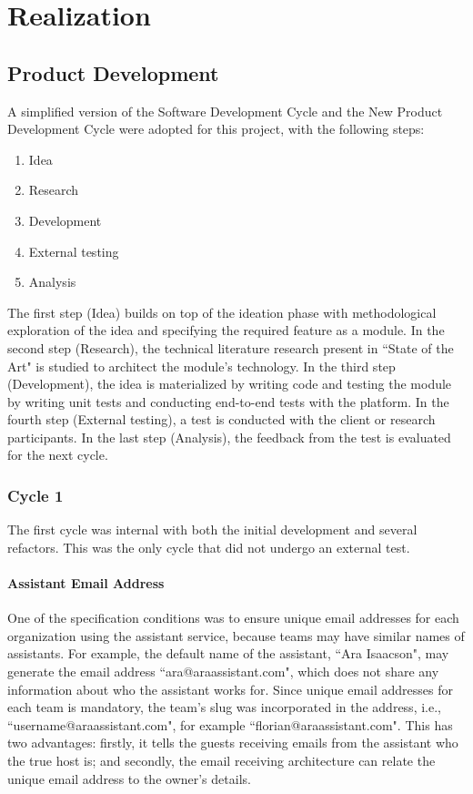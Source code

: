 \documentclass{article}
\begin{document}
\newpage

\section{Realization}

\subsection{Product Development}

A simplified version of the Software Development Cycle and the New Product Development Cycle were adopted for this project, with the following steps:

\begin{enumerate}
	\item Idea
	\item Research
	\item Development
	\item External testing
	\item Analysis
\end{enumerate}

The first step (Idea) builds on top of the ideation phase with methodological exploration of the idea and specifying the required feature as a module. In the second step (Research), the technical literature research present in ``State of the Art" is studied to architect the module's technology. In the third step (Development), the idea is materialized by writing code and testing the module by writing unit tests and conducting end-to-end tests with the platform. In the fourth step (External testing), a test is conducted with the client or research participants. In the last step (Analysis), the feedback from the test is evaluated for the next cycle.

\subsubsection{Cycle 1}

The first cycle was internal with both the initial development and several refactors. This was the only cycle that did not undergo an external test.

\paragraph{Assistant Email Address}

One of the specification conditions was to ensure unique email addresses for each organization using the assistant service, because teams may have similar names of assistants. For example, the default name of the assistant, ``Ara Isaacson", may generate the email address ``ara@araassistant.com", which does not share any information about who the assistant works for. Since unique email addresses for each team is mandatory, the team's slug was incorporated in the address, i.e., ``username@araassistant.com", for example ``florian@araassistant.com". This has two advantages: firstly, it tells the guests receiving emails from the assistant who the true host is; and secondly, the email receiving architecture can relate the unique email address to the owner's details.
\end{document}

